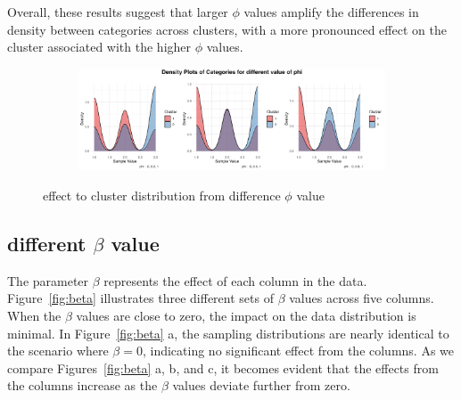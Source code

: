 \documentclass{article}
\begin{document}
Overall, these results suggest that larger $\phi$ values amplify the differences in density between categories across clusters, 
with a more pronounced effect on the cluster associated with the higher $\phi$ values.

\begin{figure}[htbp!]
  \centering
  \begin{subfigure}{1.0\textwidth}
      \centering
      \includegraphics[width=\textwidth]{images/para_sim/phi.png}
  \end{subfigure}
  \caption{effect to cluster distribution from difference $\phi$ value}
  \label{fig:phi}
\end{figure}

\subsection{different $\beta$ value}
The parameter $\beta$ represents the effect of each column in the data. 
Figure~\ref{fig:beta} illustrates three different sets of $\beta$ values across five columns. 
When the $\beta$ values are close to zero, the impact on the data distribution is minimal. 
In Figure~\ref{fig:beta} a, the sampling distributions are nearly identical to the scenario where $\beta = 0$, 
indicating no significant effect from the columns. 
As we compare Figures~\ref{fig:beta} a, b, and c, it becomes evident that the effects 
from the columns increase as the $\beta$ values deviate further from zero.
\end{document}
